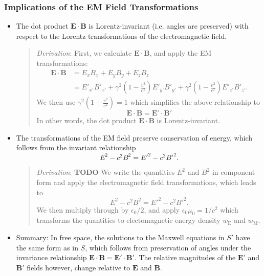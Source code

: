 \documentclass[11pt, a4paper]{article}
\renewcommand{\vec}[1]{\bm{#1}} %
\newcommand{\E}{\vec{E}} %
\newcommand{\B}{\vec{B}} %
\newcommand{\ee}{\epsilon_{0}}  %
\newcommand{\mm}{\mu_{0}}  %
\begin{document}
\subsubsection{Implications of the EM Field Transformations}
\begin{itemize}
    
    \item The dot product $ \E \cdot \B $ is Lorentz-invariant (i.e. angles are preserved) with respect to the Lorentz transformations of the electromagnetic field.
    \begin{quote}
        \textit{Derivation}: First, we calculate $ \E \cdot \B $, and apply the EM transformations:
        \begin{align*}
            \E \cdot \B &= E_{x}B_{x} + E_{y}B_{y} + E_{z}B_{z} \\
            & = E'_{x'}B'_{x'} + \gamma^{2}\left(1 - \frac{v^{2}}{c^{2}}\right)E'_{y'}B'_{y'} + \gamma^{2}\left(1 - \frac{v^{2}}{c^{2}}\right)E'_{z'}B'_{z'}.
        \end{align*}
        We then use $ \gamma^{2}(1 - \frac{v^{2}}{c^{2}}) = 1 $ which simplifies the above relationship to
        \begin{equation*}
            \E \cdot \B = \E' \cdot \B'
        \end{equation*}
        In other words, the dot product $ \E \cdot \B $ is Lorentz-invariant.
    \end{quote}

    \item The transformations of the EM field preserve conservation of energy, which follows from the invariant relationship
	\begin{equation*}
		 E^{2} - c^{2}B^{2} =  E'^{2} - c^{2}B'^{2}.
	\end{equation*}
    \begin{quote}
        \textit{Derivation}: \textbf{TODO} We write the quantities $ E^{2} $ and $ B^{2} $ in component form and apply the electromagnetic field transformations, which leads to
	\begin{equation*}
		 E^{2} - c^{2}B^{2} =  E'^{2} - c^{2}B'^{2}.
	\end{equation*}
        We then multiply through by $ \ee/2 $, and apply $ \ee \mm = 1/c^{2} $ which transforms the quantities to electomagnetic energy density $ w_{\text{E}} $ and $ w_{\text{M}} $.
    \end{quote}

    \item Summary: In free space, the solutions to the Maxwell equations in $ S' $ have the same form as in $ S $, which follows from preservation of angles under the invariance relationship $ \E \cdot \B = \E' \cdot \B' $. The relative magnitudes of the $ \E' $ and $ \B' $ fields however, change relative to $ \E $ and $ \B $.
\end{itemize}
\end{document}
